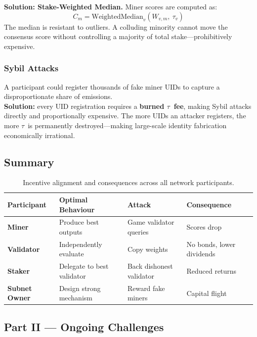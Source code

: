 \documentclass[12pt, a4paper, oneside]{report}
\newcommand{\TAO}{$\tau$}            %
\theoremstyle{definition}
\begin{document}
\textbf{Solution: Stake-Weighted Median.} Miner scores are computed as:
\[
  C_{m} = \text{WeightedMedian}_{v}\left(W_{v,m},\ \tau_{v}\right)
\]
The median is resistant to outliers. A colluding minority cannot move the consensus 
score without controlling a majority of total stake—prohibitively expensive.


\subsubsection*{Sybil Attacks}

A participant could register thousands of fake miner UIDs to capture a 
disproportionate share of emissions.\\[0.2cm]

\textbf{Solution:} every UID registration 
requires a \textbf{burned \TAO\ fee}, making Sybil attacks directly and 
proportionally expensive. The more UIDs an attacker registers, the more \TAO\ 
is permanently destroyed—making large-scale identity fabrication economically 
irrational.



\subsection*{Summary}

\begin{table}[H]
\centering
\renewcommand{\arraystretch}{1.8}
\begin{tabular}{p{2.8cm} p{3.5cm} p{3.5cm} p{3.5cm}}
\toprule
\textbf{Participant} & \textbf{Optimal Behaviour} & \textbf{Attack} & \textbf{Consequence} \\
\midrule
\textbf{Miner} & Produce best outputs & Game validator queries & Scores drop \\
\textbf{Validator} & Independently evaluate & Copy weights & No bonds, lower dividends \\
\textbf{Staker} & Delegate to best validator & Back dishonest validator & Reduced returns \\
\textbf{Subnet Owner} & Design strong mechanism & Reward fake miners & Capital flight \\
\bottomrule
\end{tabular}
\caption{Incentive alignment and consequences across all network participants.}
\label{tab:incentives}
\end{table}






\subsection*{Part II — Ongoing Challenges}
\end{document}
